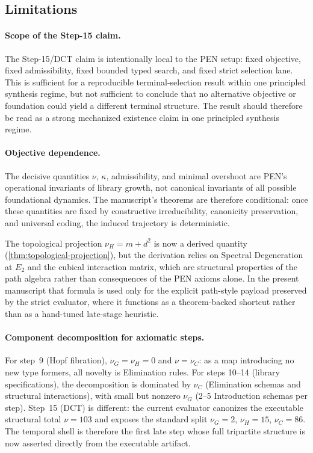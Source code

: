 \documentclass[11pt,a4paper]{article}
\theoremstyle{plain}
\theoremstyle{definition}
\theoremstyle{remark}
\begin{document}
\subsection{Limitations}

\paragraph{Scope of the Step-15 claim.}
The Step-15/DCT claim is intentionally local to the PEN setup: fixed objective, fixed admissibility, fixed bounded typed search, and fixed strict selection lane.
This is sufficient for a reproducible terminal-selection result within one principled synthesis regime, but not sufficient to conclude that no alternative objective or foundation could yield a different terminal structure.
The result should therefore be read as a strong mechanized existence claim in one principled synthesis regime.

\paragraph{Objective dependence.}
The decisive quantities $\nu$, $\kappa$, admissibility, and minimal overshoot are PEN's operational invariants of library growth, not canonical invariants of all possible foundational dynamics.
The manuscript's theorems are therefore conditional: once these quantities are fixed by constructive irreducibility, canonicity preservation, and universal coding, the induced trajectory is deterministic.

The topological projection $\nu_H = m + d^2$ is now a derived quantity (\cref{thm:topological-projection}), but the derivation relies on Spectral Degeneration at $E_2$ and the cubical interaction matrix, which are structural properties of the path algebra rather than consequences of the PEN axioms alone.
In the present manuscript that formula is used only for the explicit path-style payload preserved by the strict evaluator, where it functions as a theorem-backed shortcut rather than as a hand-tuned late-stage heuristic.

\paragraph{Component decomposition for axiomatic steps.}
For step~9 (Hopf fibration), $\nu_G = \nu_H = 0$ and $\nu = \nu_C$: as a map introducing no new type formers, all novelty is Elimination rules.
For steps 10--14 (library specifications), the decomposition is dominated by $\nu_C$ (Elimination schemas and structural interactions), with small but nonzero $\nu_G$ (2--5 Introduction schemas per step).
Step~15 (DCT) is different: the current evaluator canonizes the executable structural total $\nu = 103$ and exposes the standard split $\nu_G=2$, $\nu_H=15$, $\nu_C=86$.
The temporal shell is therefore the first late step whose full tripartite structure is now asserted directly from the executable artifact.
\end{document}
